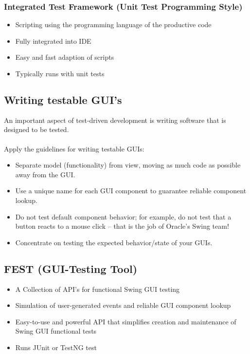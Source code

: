 \documentclass[a4paper,10pt]{article}
\begin{document}
\subsubsection{Integrated Test Framework (Unit Test Programming Style)}
\begin{itemize}
\item Scripting using the programming language of the productive code
\item Fully integrated into IDE
\item Easy and fast adaption of scripts
\item Typically runs with unit tests
\end{itemize}

\subsection{Writing testable GUI's}
An important aspect of test-driven development is writing software that is designed to be tested.\\
\\
Apply the guidelines for writing testable GUIs:
\begin{itemize}
\item Separate model (functionality) from view, moving as much code as possible away from the GUI.
\item Use a unique name for each GUI component to guarantee reliable component lookup.
\item Do not test default component behavior; for example, do not test that a button reacts to a mouse click -- that is the job of Oracle’s Swing team!
\item Concentrate on testing the expected behavior/state of your GUIs.
\end{itemize}

\subsection{FEST (GUI-Testing Tool)}
\begin{itemize}
\item A Collection of API’s for functional Swing GUI testing
\item Simulation of user-generated events and reliable GUI component lookup
\item Easy-to-use and powerful API that simplifies creation and maintenance of Swing GUI functional tests
\item Runs JUnit or TestNG test
\end{itemize}
\end{document}
